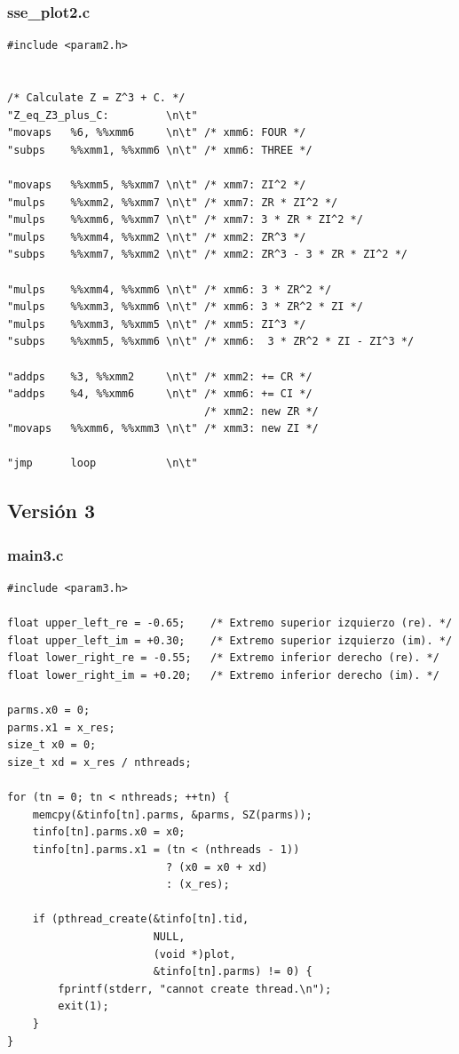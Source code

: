 \documentclass[a4paper,10pt]{article}
\begin{document}
\subsubsection{sse\_plot2.c}
\begin{verbatim}
#include <param2.h>


/* Calculate Z = Z^3 + C. */
"Z_eq_Z3_plus_C:         \n\t"
"movaps   %6, %%xmm6     \n\t" /* xmm6: FOUR */
"subps    %%xmm1, %%xmm6 \n\t" /* xmm6: THREE */

"movaps   %%xmm5, %%xmm7 \n\t" /* xmm7: ZI^2 */
"mulps    %%xmm2, %%xmm7 \n\t" /* xmm7: ZR * ZI^2 */
"mulps    %%xmm6, %%xmm7 \n\t" /* xmm7: 3 * ZR * ZI^2 */
"mulps    %%xmm4, %%xmm2 \n\t" /* xmm2: ZR^3 */
"subps    %%xmm7, %%xmm2 \n\t" /* xmm2: ZR^3 - 3 * ZR * ZI^2 */

"mulps    %%xmm4, %%xmm6 \n\t" /* xmm6: 3 * ZR^2 */
"mulps    %%xmm3, %%xmm6 \n\t" /* xmm6: 3 * ZR^2 * ZI */
"mulps    %%xmm3, %%xmm5 \n\t" /* xmm5: ZI^3 */
"subps    %%xmm5, %%xmm6 \n\t" /* xmm6:  3 * ZR^2 * ZI - ZI^3 */

"addps    %3, %%xmm2     \n\t" /* xmm2: += CR */
"addps    %4, %%xmm6     \n\t" /* xmm6: += CI */
							   /* xmm2: new ZR */
"movaps   %%xmm6, %%xmm3 \n\t" /* xmm3: new ZI */

"jmp      loop           \n\t"
\end{verbatim}


\subsection{Versión 3}
\subsubsection{main3.c}
\begin{verbatim}
#include <param3.h>

float upper_left_re = -0.65;	/* Extremo superior izquierzo (re). */
float upper_left_im = +0.30;	/* Extremo superior izquierzo (im). */
float lower_right_re = -0.55;	/* Extremo inferior derecho (re). */
float lower_right_im = +0.20;	/* Extremo inferior derecho (im). */

parms.x0 = 0;
parms.x1 = x_res;
size_t x0 = 0;
size_t xd = x_res / nthreads;

for (tn = 0; tn < nthreads; ++tn) {
	memcpy(&tinfo[tn].parms, &parms, SZ(parms));
	tinfo[tn].parms.x0 = x0;
	tinfo[tn].parms.x1 = (tn < (nthreads - 1))
	                     ? (x0 = x0 + xd)
	                     : (x_res);

	if (pthread_create(&tinfo[tn].tid, 
	                   NULL, 
	                   (void *)plot,
	                   &tinfo[tn].parms) != 0) {
		fprintf(stderr, "cannot create thread.\n");
		exit(1);
	}
}

\end{verbatim}
\end{document}
